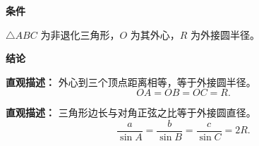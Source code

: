 \begin{statementbox}
	\textbf{\textcolor{CStatement}{条件}}
	\begin{description}[style=nextline, leftmargin=2.8em, labelsep=0.5em, itemsep=0.35em]
		\item[\textbf{\textcolor{CStatement}{条件1（三角形与外心）：}}] $\triangle ABC$ 为非退化三角形，$O$ 为其外心，$R$ 为外接圆半径。
	\end{description}

	\textbf{\textcolor{CStatement}{结论}}
	\begin{description}[style=nextline, leftmargin=2.8em, labelsep=0.5em, itemsep=0.45em]
		\item[\textbf{\textcolor{CStatement}{结论一（等距关系）：}}]
			\textbf{\textcolor{CStatement}{直观描述：}}
			外心到三个顶点距离相等，等于外接圆半径。
			\[
				OA = OB = OC = R.
			\]

		\item[\textbf{\textcolor{CStatement}{推广结论（正弦定理形式）：}}]
			\textbf{\textcolor{CStatement}{直观描述：}}
			三角形边长与对角正弦之比等于外接圆直径。
			\[
				\frac{a}{\sin A} = \frac{b}{\sin B} = \frac{c}{\sin C} = 2R.
			\]
	\end{description}
\end{statementbox}
